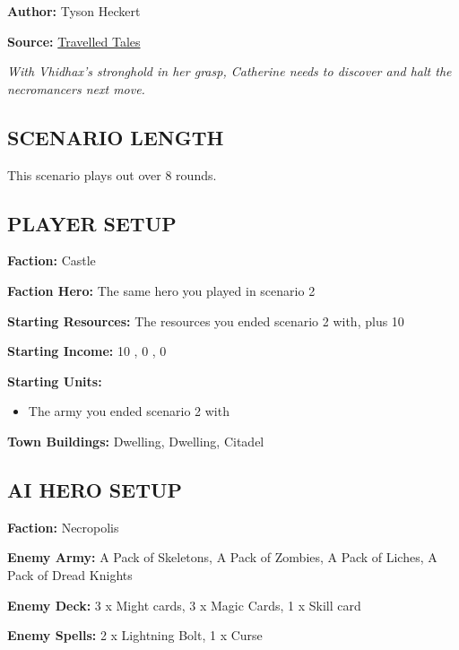
\begin{multicols*}{2}

\textbf{Author:} Tyson Heckert

\textbf{Source:} \href{https://travelledtales.com}{Travelled Tales}

\textit{With Vhidhax's stronghold in her grasp, Catherine needs to discover and halt the necromancers next move.}

\subsection*{\MakeUppercase{Scenario length}}

This scenario plays out over 8 rounds.

\subsection*{\MakeUppercase{Player setup}}

\textbf{Faction:} Castle

\textbf{Faction Hero:} The same hero you played in scenario 2

\textbf{Starting Resources:} The resources you ended scenario 2 with, plus 10 

\textbf{Starting Income:} 10 , 0 , 0 

\textbf{Starting Units:}
\begin{itemize}
  \item The army you ended scenario 2 with
\end{itemize}

\textbf{Town Buildings:}  Dwelling,  Dwelling, Citadel

\subsection*{\MakeUppercase{AI hero setup}}

\textbf{Faction:} Necropolis

\textbf{Enemy Army:} A Pack of Skeletons, A Pack of Zombies, A Pack of Liches, A Pack of Dread Knights

\textbf{Enemy Deck:} 3 x Might cards, 3 x Magic Cards, 1 x Skill card

\textbf{Enemy Spells:} 2 x Lightning Bolt, 1 x Curse


\end{multicols*}
